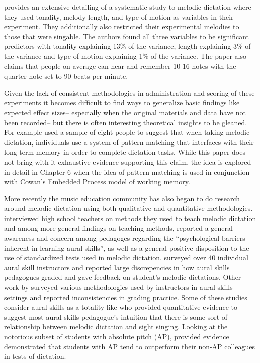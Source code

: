 \documentclass[]{book}
\begin{document}
\citet{pembrookInterferenceTranscriptionProcess1986} provides an extensive detailing of a systematic study to melodic dictation where they used tonality, melody length, and type of motion as variables in their experiment.
They additionally also restricted their experimental melodies to those that were singable.
The authors found all three variables to be significant predictors with tonality explaining 13\% of the variance, length explaining 3\% of the variance and type of motion explaining 1\% of the variance.
The paper also claims that people on average can hear and remember 10-16 notes with the quarter note set to 90 beats per minute.

Given the lack of consistent methodologies in administration and scoring of these experiments it becomes difficult to find ways to generalize basic findings like expected effect sizes-- especially when the original materials and data have not been recorded-- but there is often interesting theoretical insights to be gleaned.
For example \citet{ouraConstructingRepresentationMelody1991a} used a sample of eight people to suggest that when taking melodic dictation, individuals use a system of pattern matching that interfaces with their long term memory in order to complete dictation tasks.
While this paper does not bring with it exhaustive evidence supporting this claim, the idea is explored in detail in Chapter 6 when the idea of pattern matching is used in conjunction with Cowan's Embedded Process model of working memory.

More recently the music education community has also began to do research around melodic dictation using both qualitative and quantitative methodologies.
\citet{paneyTeachingMelodicDictation2014} interviewed high school teachers on methods they used to teach melodic dictation and among more general findings on teaching methods, reported a general awareness and concern among pedagoges regarding the ``psychological barriers inherent in learning aural skills'', as well as a general positive disposition to the use of standardized tests used in melodic dictation.
\citet{gillespieMelodicDictationScoring2001} surveyed over 40 individual aural skill instructors and reported large discrepencies in how aural skills pedagogues graded and gave feedback on student's melodic dictations.
Other work by \citet{pembrookSendHelpAural1990} surveyed various methodologies used by instructors in aural skills settings and reported inconsistencies in grading practice.
Some of these studies consider aural skills as a totality like \citet{norrisRelationshipSightSinging2003} who provided quantitative evidence to suggest most aural skills pedagogue's intuition that there is some sort of relationship between melodic dictation and sight singing.
Looking at the notorious subset of students with absolute pitch (AP), \citet{dooleyAbsolutePitchCorrelates2010} provided evidence demonstrated that students with AP tend to outperform their non-AP colleagues in tests of dictation.
\end{document}

